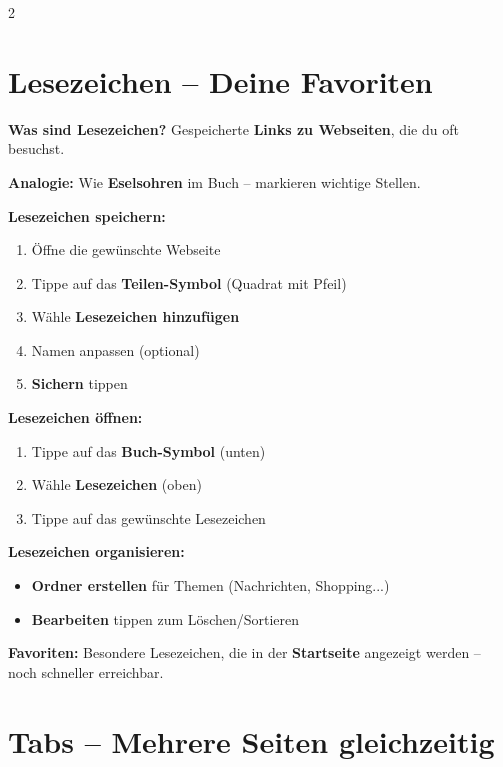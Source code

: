\documentclass[a4paper,landscape,8pt]{extarticle}
\begin{document}
\begin{multicols}{2}

\section*{\textcolor{bookmarkpurple}{Lesezeichen -- Deine Favoriten}}

\textbf{Was sind Lesezeichen?} Gespeicherte \textbf{Links zu Webseiten}, die du oft besuchst.

\textbf{Analogie:} Wie \textbf{Eselsohren} im Buch -- markieren wichtige Stellen.

\vspace{2mm}

\textbf{Lesezeichen speichern:}
\begin{enumerate}
\item Öffne die gewünschte Webseite
\item Tippe auf das \textbf{Teilen-Symbol} (Quadrat mit Pfeil)
\item Wähle \textbf{\glqq Lesezeichen hinzufügen\grqq{}}
\item Namen anpassen (optional)
\item \textbf{\glqq Sichern\grqq{}} tippen
\end{enumerate}

\textbf{Lesezeichen öffnen:}
\begin{enumerate}
\item Tippe auf das \textbf{Buch-Symbol} (unten)
\item Wähle \textbf{Lesezeichen} (oben)
\item Tippe auf das gewünschte Lesezeichen
\end{enumerate}

\textbf{Lesezeichen organisieren:}
\begin{itemize}
\item \textbf{Ordner erstellen} für Themen (Nachrichten, Shopping...)
\item \textbf{Bearbeiten} tippen zum Löschen/Sortieren
\end{itemize}

\vspace{2mm}

\textbf{Favoriten:} Besondere Lesezeichen, die in der \textbf{Startseite} angezeigt werden -- noch schneller erreichbar.

\vspace{3mm}

\section*{\textcolor{tabsorange}{Tabs -- Mehrere Seiten gleichzeitig}}


\end{multicols}
\end{document}
